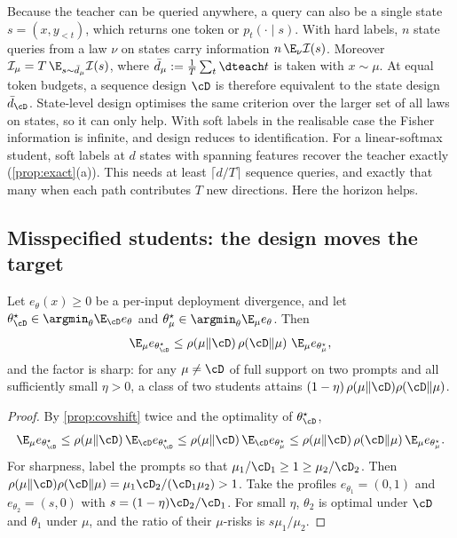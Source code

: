 \begin{remark}\label{rem:state-design}
Because the teacher can be queried anywhere, a query can also be a single state $s=(x,y_{<t})$, which
returns one token or $p_t(\cdot\mid s)$. With hard labels, $n$ state queries from a law $\nu$ on states carry
information $n\,\E_\nu\mathcal I(s)$. Moreover $\mathcal I_\mu=T\,\E_{s\sim\bar d_\mu}\mathcal I(s)$, where
$\bar d_\mu:=\frac1T\sum_t\dteach t$ is taken with $x\sim\mu$. At equal token budgets, a sequence design $\cD$ is
therefore equivalent to the state design $\bar d_\cD$. State-level design optimises the same criterion over
the larger set of all laws on states, so it can only help. With soft labels in the realisable case the
Fisher information is infinite, and design reduces to identification. For a linear-softmax student,
soft labels at $d$ states with spanning features recover the teacher exactly (\cref{prop:exact}(a)). This
needs at least $\lceil d/T\rceil$ sequence queries, and exactly that many when each path contributes $T$ new
directions. Here the horizon helps.
\end{remark}

\subsection{Misspecified students: the design moves the target}\label{sec:mis-design}

\begin{proposition}\label{prop:bias-design}
\Pv\Ck Let $e_\theta(x)\ge0$ be a per-input deployment divergence, and let
$\theta^\star_\cD\in\argmin_\theta\E_\cD e_\theta$ and $\theta^\star_\mu\in\argmin_\theta\E_\mu e_\theta$. Then
\[
\E_\mu e_{\theta^\star_\cD}\le\rho(\mu\|\cD)\,\rho(\cD\|\mu)\ \E_\mu e_{\theta^\star_\mu},
\]
and the factor is sharp: for any $\mu\ne\cD$ of full support on two prompts and all sufficiently small
$\eta>0$, a class of two students attains $(1-\eta)\,\rho(\mu\|\cD)\rho(\cD\|\mu)$.
\end{proposition}
\begin{proof}
By \cref{prop:covshift} twice and the optimality of $\theta^\star_\cD$,
\[
\E_\mu e_{\theta^\star_\cD}\le\rho(\mu\|\cD)\,\E_\cD e_{\theta^\star_\cD}\le\rho(\mu\|\cD)\,\E_\cD e_{\theta^\star_\mu}\le\rho(\mu\|\cD)\,\rho(\cD\|\mu)\,\E_\mu e_{\theta^\star_\mu}.
\]
For sharpness, label the prompts so that $\mu_1/\cD_1\ge1\ge\mu_2/\cD_2$. Then
$\rho(\mu\|\cD)\rho(\cD\|\mu)=\mu_1\cD_2/(\cD_1\mu_2)>1$. Take the profiles $e_{\theta_1}=(0,1)$ and $e_{\theta_2}=(s,0)$ with
$s=(1-\eta)\cD_2/\cD_1$. For small $\eta$, $\theta_2$ is optimal under $\cD$ and $\theta_1$ under $\mu$, and the ratio of their
$\mu$-risks is $s\mu_1/\mu_2$.
\end{proof}

